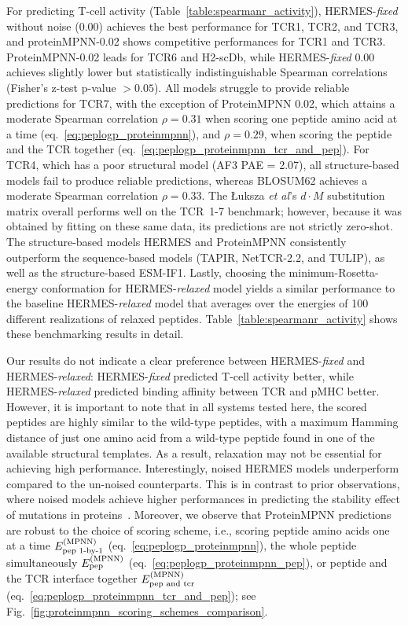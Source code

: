 For predicting T-cell activity (Table~\ref{table:spearmanr_activity}), HERMES-{\em fixed} without
noise (0.00) achieves the best performance for TCR1, TCR2, and TCR3, and proteinMPNN-0.02 shows
competitive performances for TCR1 and TCR3. ProteinMPNN-0.02 leads for TCR6 and H2-scDb, while
HERMES-{\em fixed} 0.00 achieves slightly lower but statistically indistinguishable Spearman
correlations (Fisher's z-test p-value $>0.05$). All models struggle to provide reliable predictions
for TCR7, with the exception of ProteinMPNN 0.02, which attains a moderate Spearman correlation
$\rho=0.31$ when scoring one peptide amino acid at a time (eq.~\ref{eq:peplogp_proteinmpnn}), and
$\rho=0.29$, when scoring the peptide and the TCR together
(eq.~\ref{eq:peplogp_proteinmpnn_tcr_and_pep}). For TCR4, which has a poor structural model (AF3 PAE
= 2.07), all structure-based models fail to produce reliable predictions, whereas BLOSUM62 achieves
a moderate Spearman correlation $\rho=0.33$. The \L uksza {\em et al}'s $d \cdot M$ substitution
matrix overall performs well on the TCR~1-7 benchmark; however, because it was obtained by fitting
on these same data, its predictions are not strictly zero-shot. The structure-based models HERMES
and ProteinMPNN consistently outperform the sequence-based models (TAPIR, NetTCR-2.2, and TULIP), as
well as the structure-based ESM-IF1. Lastly, choosing the minimum-Rosetta-energy conformation for
HERMES-{\em relaxed} model yields a similar performance to the baseline HERMES-{\em relaxed} model
that averages over the energies of 100 different realizations of relaxed peptides.
Table~\ref{table:spearmanr_activity} shows these benchmarking results in detail.

Our results do not indicate a clear preference between HERMES-{\em fixed} and HERMES-{\em relaxed}:
HERMES-{\em fixed} predicted T-cell activity better, while HERMES-{\em relaxed} predicted binding
affinity between TCR and pMHC better. However, it is important to note that in all systems tested
here, the scored peptides are highly similar to the wild-type peptides, with a maximum Hamming
distance of just one amino acid from a wild-type peptide found in one of the available structural
templates. As a result, relaxation may not be essential for achieving high performance.
Interestingly, noised HERMES models underperform compared to the un-noised counterparts. This is in
contrast to prior observations, where noised models achieve higher performances in predicting the
stability effect of mutations in proteins~\cite{Visani2024-sh}.
 Moreover, we observe that ProteinMPNN predictions are robust to the choice of scoring scheme, i.e.,
 scoring peptide amino acids one at a time $E^{\rm (MPNN)}_{\text{pep 1-by-1}}$
 (eq.~\ref{eq:peplogp_proteinmpnn}), the whole peptide simultaneously $E^{\rm (MPNN)}_{\text{pep}}$
 (eq.~\ref{eq:peplogp_proteinmpnn_pep}), or peptide and the TCR interface together $E^{\rm
 (MPNN)}_{\text{pep and tcr}}$ (eq.~\ref{eq:peplogp_proteinmpnn_tcr_and_pep}); see
 Fig.~\ref{fig:proteinmpnn_scoring_schemes_comparison}.

